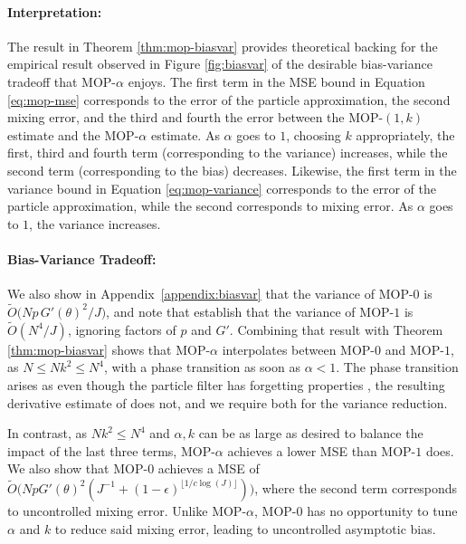 \documentclass[11pt]{article}
\newcommand\arxiv[2]{#1} %
\begin{document}
\paragraph{Interpretation:} The result in Theorem \ref{thm:mop-biasvar} provides theoretical backing for the empirical result observed in Figure \ref{fig:biasvar} of the desirable bias-variance tradeoff that MOP-$\alpha$ enjoys. The first term in the MSE bound in Equation \ref{eq:mop-mse} corresponds to the error of the particle approximation, the second mixing error, and the third and fourth the error between the MOP-$(1,k)$ estimate and the MOP-$\alpha$ estimate. As $\alpha$ goes to $1$, choosing $k$ appropriately, the first, third and fourth term (corresponding to the variance) increases, while the second term (corresponding to the bias) decreases. Likewise, the first term in the variance bound in Equation \ref{eq:mop-variance} corresponds to the error of the particle approximation, while the second corresponds to mixing error. As $\alpha$ goes to $1$, the variance increases. 

\paragraph{Bias-Variance Tradeoff:} We also show in \arxiv{Appendix~\ref{appendix:biasvar}}{the supplementary material} that the variance of MOP-$0$ is $\tilde{O}\big( Np \, G'(\theta)^2\big/J \big)$, and note that \cite{poyiadjis11} establish that the variance of MOP-$1$ is $\tilde{O}(N^4/J)$, ignoring factors of $p$ and $G'$. 
Combining that result with Theorem \ref{thm:mop-biasvar} shows that MOP-$\alpha$ interpolates between MOP-$0$ and MOP-$1$, as $N \leq Nk^2 \leq N^4$, with a phase transition as soon as $\alpha<1$. The phase transition arises as even though the particle filter has forgetting properties \cite{karjalainen23}, the resulting derivative estimate of \cite{poyiadjis11} does not, and we require both for the variance reduction. 

In contrast, as $Nk^2 \leq N^4$ and $\alpha, k$ can be as large as desired to balance the impact of the last three terms, MOP-$\alpha$ achieves a lower MSE than MOP-$1$ does. We also show that MOP-$0$ achieves a MSE of $\tilde{O}\big(NpG'(\theta)^2(J^{-1}+(1-\epsilon)^{\lfloor1/c\log(J)\rfloor})\big)$, where the second term corresponds to uncontrolled mixing error. Unlike MOP-$\alpha$, MOP-$0$ has no opportunity to tune $\alpha$ and $k$ to reduce said mixing error, leading to uncontrolled asymptotic bias. 
\end{document}
